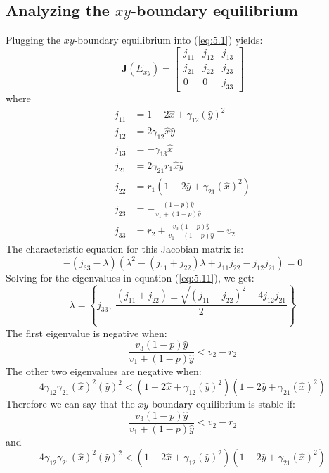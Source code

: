 \subsection{Analyzing the $xy$-boundary equilibrium}\label{subsec:stability_xy_boundary_equilibrium}
Plugging the $xy$-boundary equilibrium into (\ref{eq:5.1}) yields:
\begin{equation}
    \textbf{J}\left(E_{xy}\right)=\begin{bmatrix}
        j_{11} & j_{12} & j_{13}\\
        j_{21} & j_{22} & j_{23}\\
        0 & 0 & j_{33}
    \end{bmatrix}
    \label{eq:5.10}
\end{equation}
where
\begin{align*}
    j_{11} &= 1-2\hat{x}+\gamma_{12}\left(\hat{y}\right)^2\\
    j_{12} &= 2\gamma_{12}\hat{x}\hat{y}\\
    j_{13} &= -\gamma_{13}\hat{x}\\
    j_{21} &= 2\gamma_{21}r_1\hat{x}\hat{y}\\
    j_{22} &= r_1\left(1-2\hat{y}+\gamma_{21}\left(\hat{x}\right)^2\right)\\
    j_{23} &= -\frac{\left(1-p\right)\hat{y}}{v_1+\left(1-p\right)\hat{y}}\\
    j_{33} &= r_2+\frac{v_3\left(1-p\right)\hat{y}}{v_1+\left(1-p\right)\hat{y}}-v_2
\end{align*}
The characteristic equation for this Jacobian matrix is:
\begin{equation}
    -\left(j_{33}-\lambda\right)\left(\lambda^2-\left(j_{11}+j_{22}\right)\lambda+j_{11}j_{22}-j_{12}j_{21}\right)=0
    \label{eq:5.11}
\end{equation}
Solving for the eigenvalues in equation (\ref{eq:5.11}), we get:
\[
\lambda=\left\{
j_{33},\ 
\frac{\left(j_{11}+j_{22}\right) \pm \sqrt{\left(j_{11}-j_{22}\right)^2+4j_{12}j_{21}}}{2}
\right\}
\]
The first eigenvalue is negative when:
\[
\frac{v_3\left(1-p\right)\hat{y}}{v_1+\left(1-p\right)\hat{y}}<v_2-r_2
\]
The other two eigenvalues are negative when:
\[
4\gamma_{12}\gamma_{21}\left(\hat{x}\right)^2\left(\hat{y}\right)^2<\left(1-2\hat{x}+\gamma_{12}\left(\hat{y}\right)^2\right)\left(1-2\hat{y}+\gamma_{21}\left(\hat{x}\right)^2\right)
\]
Therefore we can say that the $xy$-boundary equilibrium is stable if:
\[
\frac{v_3\left(1-p\right)\hat{y}}{v_1+\left(1-p\right)\hat{y}}<v_2-r_2
\]
and
\[
4\gamma_{12}\gamma_{21}\left(\hat{x}\right)^2\left(\hat{y}\right)^2<\left(1-2\hat{x}+\gamma_{12}\left(\hat{y}\right)^2\right)\left(1-2\hat{y}+\gamma_{21}\left(\hat{x}\right)^2\right)
\]

